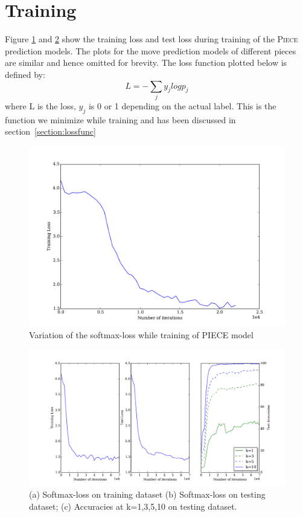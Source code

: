 \section{Training}
Figure \ref{figure:losses} and \ref{figure:losses-accuracies} show the training 
loss and test loss during training of the \textsc{Piece} prediction models. The 
plots for the move prediction models of different pieces are similar and hence 
omitted for brevity. The loss function plotted below is defined by:
\[L = - \sum_j y_j log p_j\]
where L is the loss, $y_j$ is 0 or 1 depending on the actual label. This is the 
function we minimize while training and has been discussed in 
section~\ref{section:lossfunc} 
\begin{figure}
\vspace*{-0.5in}
  \includegraphics[width=1.0\textwidth,center]{plots/training_curve_new.pdf}
  \caption{Variation of the softmax-loss while training of 
\textsc{PIECE} model}
  \label{figure:losses}
\end{figure}
\begin{figure}
  \includegraphics[width=1.55\textwidth,center]{plots/learning_curve_new.pdf}
  \caption[Variation of the accuracies on test set while training]{
  (a) Softmax-loss on training dataset (b) Softmax-loss on 
testing dataset; (c) Accuracies at k=1,3,5,10 on testing dataset.}
  \label{figure:losses-accuracies}
\end{figure}

